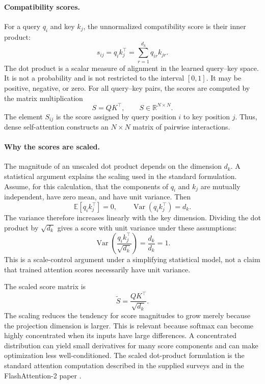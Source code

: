 \paragraph{Compatibility scores.}
For a query \(q_i\) and key \(k_j\), the unnormalized compatibility score is
their inner product:
\begin{equation}
    s_{ij}=q_i k_j^\top
    =\sum_{r=1}^{d_k}q_{ir}k_{jr}.
    \label{eq:attn-dot-product-score}
\end{equation}
The dot product is a scalar measure of alignment in the learned query--key
space. It is not a probability and is not restricted to the interval
\([0,1]\). It may be positive, negative, or zero. For all query--key pairs,
the scores are computed by the matrix multiplication
\begin{equation}
    S=QK^\top,
    \qquad
    S\in\mathbb{R}^{N\times N}.
    \label{eq:attn-score-matrix}
\end{equation}
The element \(S_{ij}\) is the score assigned by query position \(i\) to key
position \(j\). Thus, dense self-attention constructs an \(N\times N\)
matrix of pairwise interactions.

\paragraph{Why the scores are scaled.}
The magnitude of an unscaled dot product depends on the dimension \(d_k\).
A statistical argument explains the scaling used in the standard
formulation. Assume, for this calculation, that the components of \(q_i\)
and \(k_j\) are mutually independent, have zero mean, and have unit
variance. Then
\begin{equation}
    \mathbb{E}[q_i k_j^\top]=0,
    \qquad
    \operatorname{Var}(q_i k_j^\top)=d_k.
    \label{eq:attn-dot-product-variance}
\end{equation}
The variance therefore increases linearly with the key dimension. Dividing
the dot product by \(\sqrt{d_k}\) gives a score with unit variance under
these assumptions:
\begin{equation}
    \operatorname{Var}
    \left(
        \frac{q_i k_j^\top}{\sqrt{d_k}}
    \right)
    =
    \frac{d_k}{d_k}=1.
    \label{eq:attn-scaled-variance}
\end{equation}
This is a scale-control argument under a simplifying statistical model, not
a claim that trained attention scores necessarily have unit variance.

The scaled score matrix is
\begin{equation}
    \widetilde S
    =
    \frac{QK^\top}{\sqrt{d_k}}.
    \label{eq:attn-scaled-score}
\end{equation}
The scaling reduces the tendency for score magnitudes to grow merely because
the projection dimension is larger. This is relevant because softmax can
become highly concentrated when its inputs have large differences. A
concentrated distribution can yield small derivatives for many score
components and can make optimization less well-conditioned. The scaled
dot-product formulation is the standard attention computation described in
the supplied surveys and in the FlashAttention-2 paper
\parencite{ansar2024transformers,dao2023flashattention2}.

